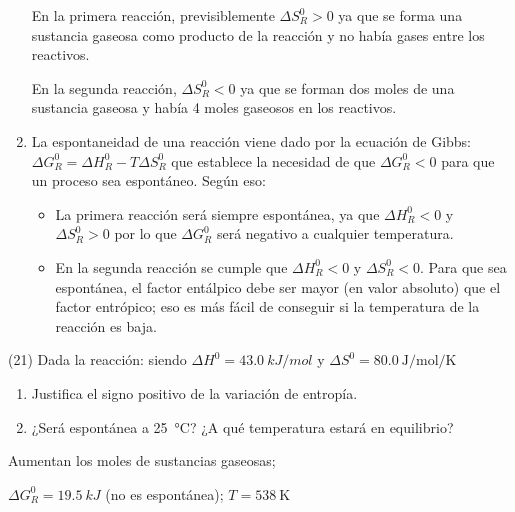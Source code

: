 \documentclass[10pt]{article}
\begin{document}
\begin{multicols}{2}
\begin{solution}[print=false]
\begin{enumerate}
    En la primera reacción, previsiblemente \( \Delta S^0_R > 0 \) ya que se forma una sustancia gaseosa como producto de la reacción y no había gases entre los reactivos.

    En la segunda reacción, \( \Delta S^0_R < 0 \) ya que se forman dos moles de una sustancia gaseosa y había 4 moles gaseosos en los reactivos.

    \item La espontaneidad de una reacción viene dado por la ecuación de Gibbs: \( \Delta G^0_R = \Delta H^0_R - T\Delta S^0_R \) que establece la necesidad de que \( \Delta G^0_R < 0 \) para que un proceso sea espontáneo. Según eso:

    \begin{itemize}
      \item La primera reacción será siempre espontánea, ya que \( \Delta H^0_R < 0 \) y \( \Delta S^0_R > 0 \) por lo que \( \Delta G^0_R \) será negativo a cualquier temperatura.
      \item En la segunda reacción se cumple que \( \Delta H^0_R < 0 \) y \( \Delta S^0_R < 0 \). Para que sea espontánea, el factor entálpico debe ser mayor (en valor absoluto) que el factor entrópico; eso es más fácil de conseguir si la temperatura de la reacción es baja.
    \end{itemize}
  \end{enumerate}
\end{solution}




\begin{exercise}[
    tags    = {},
    topics  = {química, termodinámica, termoquímica},
    source  = {FQ 1B MGH 2016, p181, e21},
  ]
  (21) Dada la reacción: 
  siendo \( \Delta H^0 = \SI{43.0}{kJ/mol} \) y \( \Delta S^0 = \SI{80.0}{\joule\per\mole\per\kelvin} \)

  \begin{enumerate}
    \item Justifica el signo positivo de la variación de entropía.
    \item ¿Será espontánea a \SI{25}{\celsius}? ¿A qué temperatura estará en
    equilibrio?
  \end{enumerate}
\end{exercise}

\begin{solution}
  \begin{enumerate*}
    \item Aumentan los moles de sustancias gaseosas; \item \( \Delta G^0_R = \SI{19.5}{kJ} \) (no es espontánea); \( T = \SI{538}{\kelvin} \)
  \end{enumerate*}
\end{solution}





\end{multicols}
\end{document}

